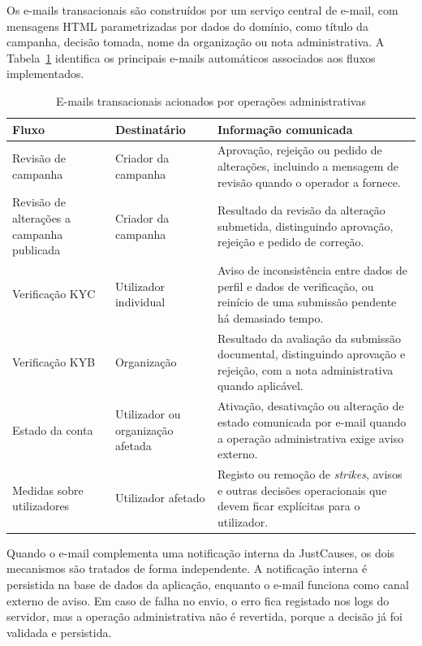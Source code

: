 Os e-mails transacionais são construídos por um serviço central de e-mail, com mensagens HTML parametrizadas por dados do domínio, como título da campanha, decisão tomada, nome da organização ou nota administrativa. A Tabela~\ref{tab:emails_transacionais} identifica os principais e-mails automáticos associados aos fluxos implementados.

\begin{table}[H]
\caption{E-mails transacionais acionados por operações administrativas}
\label{tab:emails_transacionais}
\begin{center}
\footnotesize
\begin{tabular}{|p{3.5cm}|p{3.4cm}|p{6.2cm}|}
\hline
\textbf{Fluxo} & \textbf{Destinatário} & \textbf{Informação comunicada} \\ \hline
Revisão de campanha & Criador da campanha & Aprovação, rejeição ou pedido de alterações, incluindo a mensagem de revisão quando o operador a fornece. \\ \hline
Revisão de alterações a campanha publicada & Criador da campanha & Resultado da revisão da alteração submetida, distinguindo aprovação, rejeição e pedido de correção. \\ \hline
Verificação KYC & Utilizador individual & Aviso de inconsistência entre dados de perfil e dados de verificação, ou reinício de uma submissão pendente há demasiado tempo. \\ \hline
Verificação KYB & Organização & Resultado da avaliação da submissão documental, distinguindo aprovação e rejeição, com a nota administrativa quando aplicável. \\ \hline
Estado da conta & Utilizador ou organização afetada & Ativação, desativação ou alteração de estado comunicada por e-mail quando a operação administrativa exige aviso externo. \\ \hline
Medidas sobre utilizadores & Utilizador afetado & Registo ou remoção de \textit{strikes}, avisos e outras decisões operacionais que devem ficar explícitas para o utilizador. \\ \hline
\end{tabular}
\end{center}
\end{table}

Quando o e-mail complementa uma notificação interna da JustCauses, os dois mecanismos são tratados de forma independente. A notificação interna é persistida na base de dados da aplicação, enquanto o e-mail funciona como canal externo de aviso. Em caso de falha no envio, o erro fica registado nos logs do servidor, mas a operação administrativa não é revertida, porque a decisão já foi validada e persistida.

